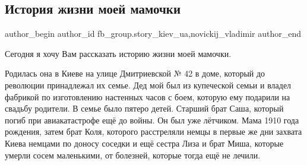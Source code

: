  
 
 
 
 
 
\subsection{История жизни моей мамочки}
\label{sec:18_01_2022.fb.fb_group.story_kiev_ua.1.mamochka}
 
\ifcmt
 author_begin
   author_id fb_group.story_kiev_ua,novickij_vladimir
 author_end
\fi

Сегодня я хочу Вам рассказать историю жизни моей мамочки.     

Родилась она в Киеве на улице Дмитриевской № 42 в доме, который до революции
принадлежал их семье. Дед мой был из купеческой семьи и владел фабрикой по
изготовлению настенных часов с боем, которую ему подарили на свадьбу родители.
В семье было пятеро детей. Старший брат Саша, который погиб при авиакатастрофе
ещё до войны. Он был уже лётчиком.  Мама 1910 года рождения, затем брат Коля,
которого расстреляли немцы в первые же дни захвата Киева немцами по доносу
соседки и ещё сестра Лиза и брат Миша, которые умерли сосем маленькими, от
болезней, которые тогда ещё не лечили. 

\raggedcolumns
\begin{multicols}{3} %
\setlength{\parindent}{0pt}







\end{multicols} %

